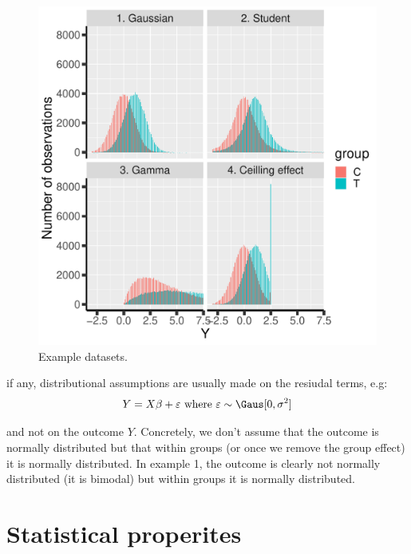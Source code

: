 \documentclass[12pt]{article}
\newcommand\Warning[1][3ex]{%
\renewcommand\stacktype{L}%
\scaleto{\stackon[1.3pt]{\color{red}$\triangle$}{\tiny\bfseries !}}{#1}%
\xspace
}
\begin{document}
\begin{figure}[!h]
\centering
\includegraphics[width=\textwidth]{./figures/examples-hist.pdf}
\caption{\label{fig:examples}Example datasets.}
\end{figure}

\Warning if any, distributional assumptions are usually made on the resiudal terms, e.g:
\begin{align*}
Y = X \beta + \varepsilon \text{ where } \varepsilon \sim \Gaus[0,\sigma^2]
\end{align*}


and not on the outcome \(Y\). Concretely, we don't assume that the
outcome is normally distributed but that within groups (or once we
remove the group effect) it is normally distributed. In example 1, the
outcome is clearly not normally distributed (it is bimodal) but within
groups it is normally distributed.

\vfill

\clearpage

\section{Statistical properites}
\label{sec:org84b8645}
\end{document}
